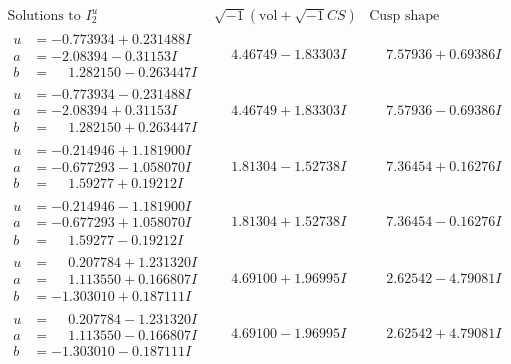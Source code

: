 \documentclass[1p]{elsarticle_modified}
\theoremstyle{definition}
\newcommand{\I}{\sqrt{-1}}
\begin{document}
$$\begin{array}{c|c|c}  
\text{Solutions to }I^u_{2}& \I (\text{vol} + \sqrt{-1}CS) & \text{Cusp shape}\\
 \hline 
\begin{aligned}
u &= -0.773934 + 0.231488 I \\
a &= -2.08394 - 0.31153 I \\
b &= \phantom{-}1.282150 - 0.263447 I\end{aligned}
 & \phantom{-}4.46749 - 1.83303 I & \phantom{-}7.57936 + 0.69386 I \\ \hline\begin{aligned}
u &= -0.773934 - 0.231488 I \\
a &= -2.08394 + 0.31153 I \\
b &= \phantom{-}1.282150 + 0.263447 I\end{aligned}
 & \phantom{-}4.46749 + 1.83303 I & \phantom{-}7.57936 - 0.69386 I \\ \hline\begin{aligned}
u &= -0.214946 + 1.181900 I \\
a &= -0.677293 - 1.058070 I \\
b &= \phantom{-}1.59277 + 0.19212 I\end{aligned}
 & \phantom{-}1.81304 - 1.52738 I & \phantom{-}7.36454 + 0.16276 I \\ \hline\begin{aligned}
u &= -0.214946 - 1.181900 I \\
a &= -0.677293 + 1.058070 I \\
b &= \phantom{-}1.59277 - 0.19212 I\end{aligned}
 & \phantom{-}1.81304 + 1.52738 I & \phantom{-}7.36454 - 0.16276 I \\ \hline\begin{aligned}
u &= \phantom{-}0.207784 + 1.231320 I \\
a &= \phantom{-}1.113550 + 0.166807 I \\
b &= -1.303010 + 0.187111 I\end{aligned}
 & \phantom{-}4.69100 + 1.96995 I & \phantom{-}2.62542 - 4.79081 I \\ \hline\begin{aligned}
u &= \phantom{-}0.207784 - 1.231320 I \\
a &= \phantom{-}1.113550 - 0.166807 I \\
b &= -1.303010 - 0.187111 I\end{aligned}
 & \phantom{-}4.69100 - 1.96995 I & \phantom{-}2.62542 + 4.79081 I \\ \hline\begin{aligned}

\end{aligned}
\end{array}$$
\end{document}
